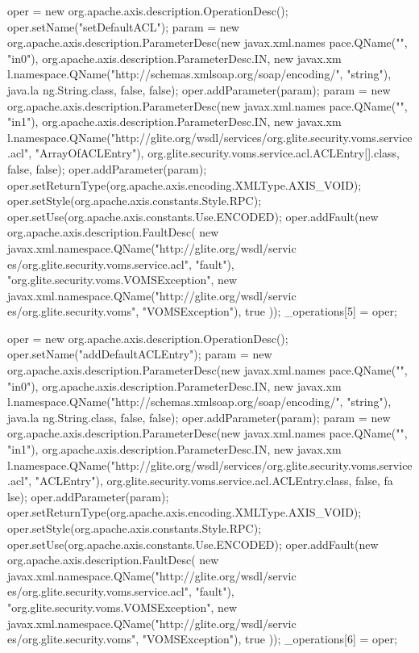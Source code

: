 \begin{DoxyCode}
{        oper = new org.apache.axis.description.OperationDesc();
        oper.setName("setDefaultACL");
        param = new org.apache.axis.description.ParameterDesc(new javax.xml.names
      pace.QName("", "in0"), org.apache.axis.description.ParameterDesc.IN, new javax.xm
      l.namespace.QName("http://schemas.xmlsoap.org/soap/encoding/", "string"), java.la
      ng.String.class, false, false);
        oper.addParameter(param);
        param = new org.apache.axis.description.ParameterDesc(new javax.xml.names
      pace.QName("", "in1"), org.apache.axis.description.ParameterDesc.IN, new javax.xm
      l.namespace.QName("http://glite.org/wsdl/services/org.glite.security.voms.service
      .acl", "ArrayOfACLEntry"), org.glite.security.voms.service.acl.ACLEntry[].class, 
      false, false);
        oper.addParameter(param);
        oper.setReturnType(org.apache.axis.encoding.XMLType.AXIS_VOID);
        oper.setStyle(org.apache.axis.constants.Style.RPC);
        oper.setUse(org.apache.axis.constants.Use.ENCODED);
        oper.addFault(new org.apache.axis.description.FaultDesc(
                      new javax.xml.namespace.QName("http://glite.org/wsdl/servic
      es/org.glite.security.voms.service.acl", "fault"),
                      "org.glite.security.voms.VOMSException",
                      new javax.xml.namespace.QName("http://glite.org/wsdl/servic
      es/org.glite.security.voms", "VOMSException"), 
                      true
                     ));
        _operations[5] = oper;

        oper = new org.apache.axis.description.OperationDesc();
        oper.setName("addDefaultACLEntry");
        param = new org.apache.axis.description.ParameterDesc(new javax.xml.names
      pace.QName("", "in0"), org.apache.axis.description.ParameterDesc.IN, new javax.xm
      l.namespace.QName("http://schemas.xmlsoap.org/soap/encoding/", "string"), java.la
      ng.String.class, false, false);
        oper.addParameter(param);
        param = new org.apache.axis.description.ParameterDesc(new javax.xml.names
      pace.QName("", "in1"), org.apache.axis.description.ParameterDesc.IN, new javax.xm
      l.namespace.QName("http://glite.org/wsdl/services/org.glite.security.voms.service
      .acl", "ACLEntry"), org.glite.security.voms.service.acl.ACLEntry.class, false, fa
      lse);
        oper.addParameter(param);
        oper.setReturnType(org.apache.axis.encoding.XMLType.AXIS_VOID);
        oper.setStyle(org.apache.axis.constants.Style.RPC);
        oper.setUse(org.apache.axis.constants.Use.ENCODED);
        oper.addFault(new org.apache.axis.description.FaultDesc(
                      new javax.xml.namespace.QName("http://glite.org/wsdl/servic
      es/org.glite.security.voms.service.acl", "fault"),
                      "org.glite.security.voms.VOMSException",
                      new javax.xml.namespace.QName("http://glite.org/wsdl/servic
      es/org.glite.security.voms", "VOMSException"), 
                      true
                     ));
        _operations[6] = oper;

}
\end{DoxyCode}
